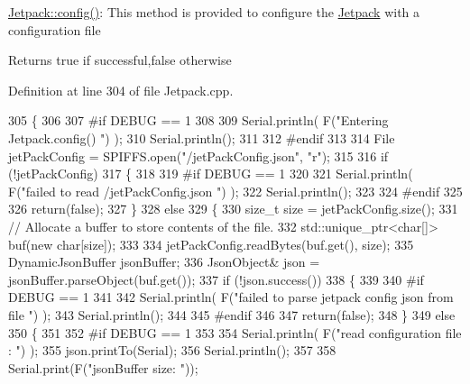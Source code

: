 \hyperlink{class_jetpack_ab065ee83e244265a2223a22f3ee4a719}{Jetpack\+::config()}\+: This method is provided to configure the \hyperlink{class_jetpack}{Jetpack} with a configuration file

\begin{DoxyReturn}{Returns}
true if successful,false otherwise 
\end{DoxyReturn}


Definition at line 304 of file Jetpack.\+cpp.


\begin{DoxyCode}
305 \{
306 
307 \textcolor{preprocessor}{#if DEBUG == 1 }
308 
309     Serial.println( F(\textcolor{stringliteral}{"Entering Jetpack.config() "}) );
310     Serial.println();
311 
312 \textcolor{preprocessor}{#endif}
313 
314     File jetPackConfig = SPIFFS.open(\textcolor{stringliteral}{"/jetPackConfig.json"}, \textcolor{stringliteral}{"r"});
315 
316     \textcolor{keywordflow}{if} (!jetPackConfig) 
317     \{
318 
319 \textcolor{preprocessor}{    #if DEBUG == 1 }
320 
321         Serial.println( F(\textcolor{stringliteral}{"failed to read /jetPackConfig.json "}) );
322         Serial.println();
323 
324 \textcolor{preprocessor}{    #endif}
325 
326         \textcolor{keywordflow}{return}(\textcolor{keyword}{false});
327     \}
328     \textcolor{keywordflow}{else}
329     \{
330         \textcolor{keywordtype}{size\_t} size = jetPackConfig.size();
331         \textcolor{comment}{// Allocate a buffer to store contents of the file.}
332         std::unique\_ptr<char[]> buf(\textcolor{keyword}{new} \textcolor{keywordtype}{char}[size]);
333 
334         jetPackConfig.readBytes(buf.get(), size);
335         DynamicJsonBuffer jsonBuffer;
336         JsonObject& json = jsonBuffer.parseObject(buf.get());
337         \textcolor{keywordflow}{if} (!json.success()) 
338         \{
339         
340 \textcolor{preprocessor}{        #if DEBUG == 1 }
341 
342             Serial.println( F(\textcolor{stringliteral}{"failed to parse jetpack config json from file "}) );
343             Serial.println();
344 
345 \textcolor{preprocessor}{        #endif}
346 
347             \textcolor{keywordflow}{return}(\textcolor{keyword}{false});
348         \} 
349         \textcolor{keywordflow}{else}
350         \{ 
351         
352 \textcolor{preprocessor}{        #if DEBUG == 1 }
353 
354             Serial.println( F(\textcolor{stringliteral}{"read configuration file : "}) );
355             json.printTo(Serial);
356             Serial.println();
357 
358             Serial.print(F(\textcolor{stringliteral}{"jsonBuffer size: "}));

\end{DoxyCode}
